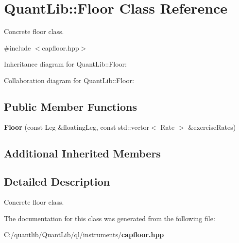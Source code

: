 \section{Quant\+Lib\+:\+:Floor Class Reference}
\label{class_quant_lib_1_1_floor}


Concrete floor class.  




{\ttfamily \#include $<$capfloor.\+hpp$>$}



Inheritance diagram for Quant\+Lib\+:\+:Floor\+:


Collaboration diagram for Quant\+Lib\+:\+:Floor\+:
\subsection*{Public Member Functions}
\begin{DoxyCompactItemize}
\item 
{\bfseries Floor} (const Leg \&floating\+Leg, const std\+::vector$<$ Rate $>$ \&exercise\+Rates)\label{class_quant_lib_1_1_floor_a37326783ccbd0c85ea338311ce914e6d}

\end{DoxyCompactItemize}
\subsection*{Additional Inherited Members}


\subsection{Detailed Description}
Concrete floor class. 



The documentation for this class was generated from the following file\+:\begin{DoxyCompactItemize}
\item 
C\+:/quantlib/\+Quant\+Lib/ql/instruments/{\bf capfloor.\+hpp}\end{DoxyCompactItemize}
